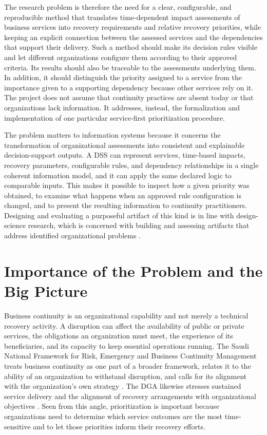 The research problem is therefore the need for a clear, configurable, and reproducible method that translates time-dependent impact assessments of business services into recovery requirements and relative recovery priorities, while keeping an explicit connection between the assessed services and the dependencies that support their delivery. Such a method should make its decision rules visible and let different organizations configure them according to their approved criteria. Its results should also be traceable to the assessments underlying them. In addition, it should distinguish the priority assigned to a service from the importance given to a supporting dependency because other services rely on it. The project does not assume that continuity practices are absent today or that organizations lack information. It addresses, instead, the formalization and implementation of one particular service-first prioritization procedure.

The problem matters to information systems because it concerns the transformation of organizational assessments into consistent and explainable decision-support outputs. A DSS can represent services, time-based impacts, recovery parameters, configurable rules, and dependency relationships in a single coherent information model, and it can apply the same declared logic to comparable inputs. This makes it possible to inspect how a given priority was obtained, to examine what happens when an approved rule configuration is changed, and to present the resulting information to continuity practitioners. Designing and evaluating a purposeful artifact of this kind is in line with design-science research, which is concerned with building and assessing artifacts that address identified organizational problems \cite{hevner2004design,peffers2007dsrm}.

\section{Importance of the Problem and the Big Picture}
\label{sec:importance}

Business continuity is an organizational capability and not merely a technical recovery activity. A disruption can affect the availability of public or private services, the obligations an organization must meet, the experience of its beneficiaries, and its capacity to keep essential operations running. The Saudi National Framework for Risk, Emergency and Business Continuity Management treats business continuity as one part of a broader framework, relates it to the ability of an organization to withstand disruption, and calls for its alignment with the organization's own strategy \cite{nrcnationalframework}. The DGA likewise stresses sustained service delivery and the alignment of recovery arrangements with organizational objectives \cite{dga2025bcm}. Seen from this angle, prioritization is important because organizations need to determine which service outcomes are the most time-sensitive and to let those priorities inform their recovery efforts.

